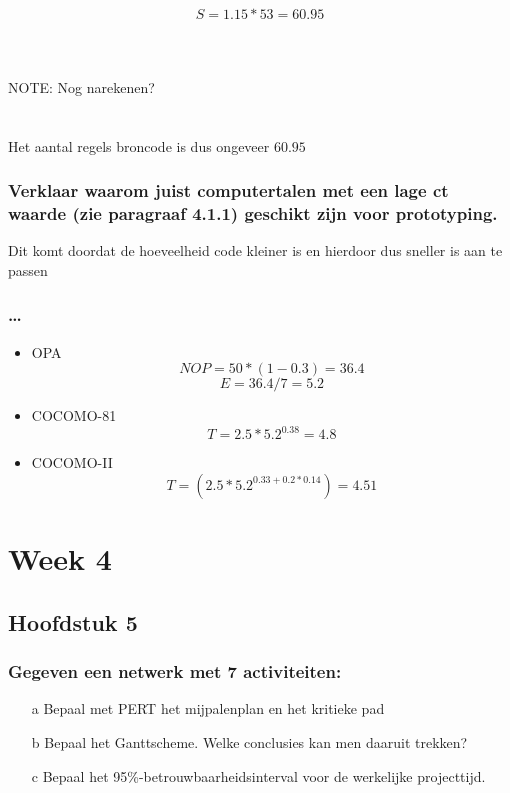 \documentclass[a4paper,titlepage]{artikel1}
\begin{document}
   \begin{displaymath}
    S=1.15*53=60.95
   \end{displaymath}
   \\\\\\NOTE: Nog narekenen?\\\\\\
   Het aantal regels broncode is dus ongeveer $60.95$
   \subsubsection[Opdracht 7]{Verklaar waarom juist computertalen met een lage ct waarde (zie paragraaf 4.1.1) geschikt zijn voor prototyping.}
   Dit komt doordat de hoeveelheid code kleiner is en hierdoor dus sneller is aan te passen
   
   \subsubsection[Opdracht 8]{\ldots}
   \begin{itemize}
    \item OPA
	  \begin{displaymath}
	   NOP=50*(1-0.3)=36.4
	  \end{displaymath} 
	  \begin{displaymath}
	   E=36.4/7=5.2
	  \end{displaymath}
    \item COCOMO-81
	  \begin{displaymath}
	   T=2.5*5.2^{0.38}=4.8
	  \end{displaymath}
    \item COCOMO-II
	  \begin{displaymath}
	   T=(2.5*5.2^{0.33+0.2*0.14})=4.51
	  \end{displaymath}
   \end{itemize}
   \section{Week 4}
   \subsection{Hoofdstuk 5}
   \subsubsection[Opdracht 1]{Gegeven een netwerk met 7 activiteiten:}
   \begin{itemize}
     \item[a] Bepaal met PERT het mijpalenplan en het kritieke pad
     \item[b] Bepaal het Ganttscheme. Welke conclusies kan men daaruit trekken?
     \item[c] Bepaal het 95\%-betrouwbaarheidsinterval voor de werkelijke projecttijd.
   \end{itemize}
\end{document}
